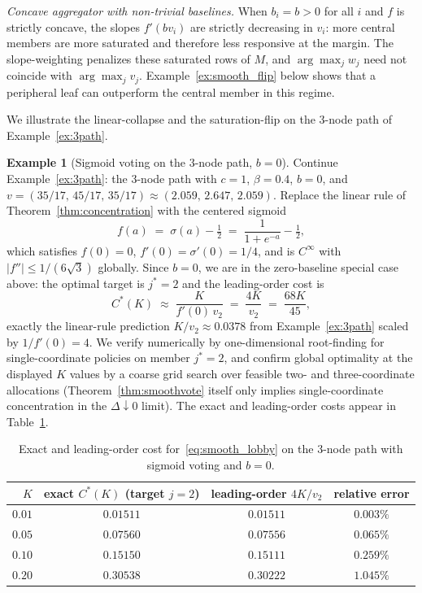 \documentclass[11pt,letterpaper]{article}
\theoremstyle{plain}
\theoremstyle{definition}
\newtheorem{example}{Example}
\theoremstyle{remark}
\begin{document}
\emph{Concave aggregator with non-trivial baselines.} When $b_i = b > 0$ for all $i$ and $f$ is strictly concave, the slopes $f'(b v_i)$ are strictly decreasing in $v_i$: more central members are more saturated and therefore less responsive at the margin. The slope-weighting penalizes these saturated rows of $M$, and $\arg\max_j w_j$ need not coincide with $\arg\max_j v_j$. Example~\ref{ex:smooth_flip} below shows that a peripheral leaf can outperform the central member in this regime.

We illustrate the linear-collapse and the saturation-flip on the 3-node path of Example~\ref{ex:3path}.

\begin{example}[Sigmoid voting on the 3-node path, $b = 0$]\label{ex:smooth3path}
Continue Example~\ref{ex:3path}: the 3-node path with $c = 1$, $\beta = 0.4$, $b = 0$, and $v = (35/17,\, 45/17,\, 35/17) \approx (2.059,\, 2.647,\, 2.059)$. Replace the linear rule of Theorem~\ref{thm:concentration} with the centered sigmoid
\[
f(a) \;=\; \sigma(a) - \tfrac{1}{2} \;=\; \frac{1}{1 + e^{-a}} - \tfrac{1}{2},
\]
which satisfies $f(0) = 0$, $f'(0) = \sigma'(0) = 1/4$, and is $C^\infty$ with $|f''| \leq 1/(6\sqrt 3)$ globally. Since $b = 0$, we are in the zero-baseline special case above: the optimal target is $j^* = 2$ and the leading-order cost is
\[
C^*(K) \;\approx\; \frac{K}{f'(0)\, v_2} \;=\; \frac{4 K}{v_2} \;=\; \frac{68 K}{45},
\]
exactly the linear-rule prediction $K/v_2 \approx 0.0378$ from Example~\ref{ex:3path} scaled by $1/f'(0) = 4$. We verify numerically by one-dimensional root-finding for single-coordinate policies on member $j^* = 2$, and confirm global optimality at the displayed $K$ values by a coarse grid search over feasible two- and three-coordinate allocations (Theorem~\ref{thm:smoothvote} itself only implies single-coordinate concentration in the $\Delta \downarrow 0$ limit). The exact and leading-order costs appear in Table~\ref{tab:smoothex}.

\begin{table}[h]
\centering
\begin{tabular}{rccc}
\toprule
$K$ & exact $C^*(K)$ (target $j = 2$) & leading-order $4K/v_2$ & relative error \\
\midrule
$0.01$ & $0.01511$ & $0.01511$ & $0.003\%$ \\
$0.05$ & $0.07560$ & $0.07556$ & $0.065\%$ \\
$0.10$ & $0.15150$ & $0.15111$ & $0.259\%$ \\
$0.20$ & $0.30538$ & $0.30222$ & $1.045\%$ \\
\bottomrule
\end{tabular}
\caption{Exact and leading-order cost for~\eqref{eq:smooth_lobby} on the 3-node path with sigmoid voting and $b = 0$.}
\label{tab:smoothex}
\end{table}


\end{example}
\end{document}
